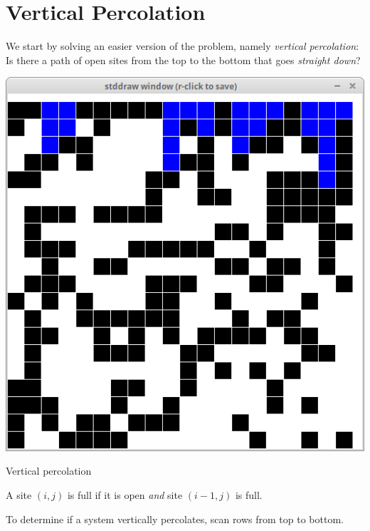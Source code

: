 \documentclass[8pt,a4paper,compress,handout]{beamer}
\begin{document}
\section{Vertical Percolation}
\begin{frame}[fragile]
We start by solving an easier version of the problem, namely \emph{vertical percolation}: Is there a path of open sites from the top to the bottom that goes \emph{straight down}?

\begin{center}
\includegraphics[scale=0.4]{figures/percolation5.png}

\smallskip

\tiny Vertical percolation
\end{center}

\bigskip

A site $(i, j)$ is full if it is open \emph{and} site $(i-1, j)$ is full.

\bigskip

To determine if a system vertically percolates, scan rows from top to bottom.


\end{frame}
\end{document}
